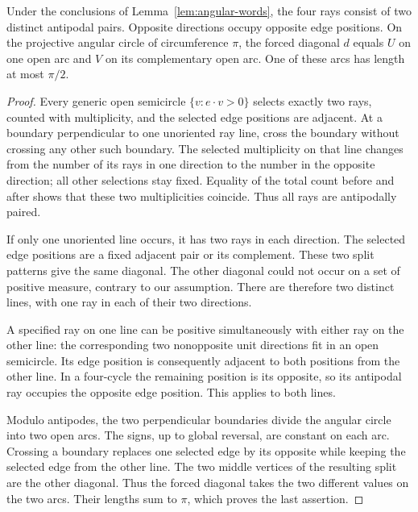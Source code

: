 \begin{lemma}\label{lem:angular-four-rays}
Under the conclusions of Lemma~\ref{lem:angular-words}, the four
rays consist of two distinct antipodal pairs.  Opposite directions
occupy opposite edge positions.  On the projective angular circle
of circumference \(\pi\), the forced diagonal \(d\) equals \(U\)
on one open arc and \(V\) on its complementary open arc.  One
of these arcs has length at most \(\pi/2\).
\end{lemma}

\begin{proof}
Every generic open semicircle \(\{v:e\cdot v>0\}\) selects
exactly two rays, counted with multiplicity, and the selected
edge positions are adjacent.  At a boundary perpendicular to
one unoriented ray line, cross the boundary without crossing
any other such boundary.  The selected multiplicity on that
line changes from the number of its rays in one direction
to the number in the opposite direction; all other selections
stay fixed.  Equality of the total count before and after
shows that these two multiplicities coincide.  Thus all rays
are antipodally paired.

If only one unoriented line occurs, it has two rays in each
direction.  The selected edge positions are a fixed adjacent
pair or its complement.  These two split patterns give the
same diagonal.  The other diagonal could not occur on a set
of positive measure, contrary to our assumption.  There are
therefore two distinct lines, with one ray in each of their
two directions.

A specified ray on one line can be positive simultaneously
with either ray on the other line: the corresponding two
nonopposite unit directions fit in an open semicircle.
Its edge position is consequently adjacent to both positions
from the other line.  In a four-cycle the remaining position
is its opposite, so its antipodal ray occupies the opposite
edge position.  This applies to both lines.

Modulo antipodes, the two perpendicular boundaries divide
the angular circle into two open arcs.  The signs, up to
global reversal, are constant on each arc.  Crossing a
boundary replaces one selected edge by its opposite while
keeping the selected edge from the other line.  The two
middle vertices of the resulting split are the other
diagonal.  Thus the forced diagonal takes the two different
values on the two arcs.  Their lengths sum to \(\pi\), which
proves the last assertion.
\end{proof}

